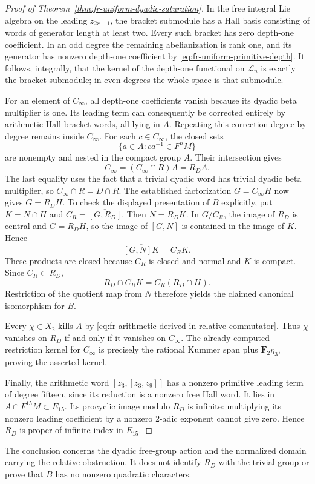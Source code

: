 \begin{proof}[Proof of Theorem~\ref{thm:fr-uniform-dyadic-saturation}]
In the free integral Lie algebra on the leading
$z_{2r+1}$, the bracket submodule has a Hall basis
consisting of words of generator length at least two.
Every such bracket has zero depth-one coefficient.
In an odd degree the remaining abelianization is
rank one, and its generator has nonzero depth-one
coefficient by
\eqref{eq:fr-uniform-primitive-depth}.
It follows, integrally, that the kernel of the
depth-one functional on $\mathcal L_n$ is exactly
the bracket submodule; in even degrees the whole
space is that submodule.

For an element of $C_\infty$, all depth-one coefficients
vanish because its dyadic beta multiplier is one.
Its leading term can consequently be corrected entirely
by arithmetic Hall bracket words, all lying in $A$.
Repeating this correction degree by degree remains
inside $C_\infty$. For each $c\in C_\infty$, the closed
sets
\[
 \{a\in A:c a^{-1}\in F^nM\}
\]
are nonempty and nested in the compact group $A$.
Their intersection gives
\[
 C_\infty=(C_\infty\cap R)A=R_DA.
\]
The last equality uses the fact that a trivial dyadic
word has trivial dyadic beta multiplier, so
$C_\infty\cap R=D\cap R$.
The established factorization $G=C_\infty H$ now gives
$G=R_DH$. To check the displayed presentation of $B$ explicitly,
put $K=N\cap H$ and $C_R=\overline{[G,R_D]}$.
Then $N=R_DK$. In $G/C_R$, the image of $R_D$ is central
and $G=R_DH$, so the image of $[G,N]$ is contained in the
image of $K$. Hence
\[
 \overline{[G,N]K}=C_RK.
\]
These products are closed because $C_R$ is closed and normal
and $K$ is compact. Since $C_R\subset R_D$,
\[
 R_D\cap C_RK=C_R(R_D\cap H).
\]
Restriction of the quotient map from $N$ therefore yields
the claimed canonical isomorphism for $B$.

Every $\chi\in X_2$ kills $A$ by
\eqref{eq:fr-arithmetic-derived-in-relative-commutator}.
Thus $\chi$ vanishes on $R_D$ if and only if it vanishes
on $C_\infty$. The already computed restriction kernel
for $C_\infty$ is precisely the rational Kummer span
plus $\mathbf F_2\eta_3$, proving the asserted kernel.

Finally, the arithmetic word
$[z_3,[z_3,z_9]]$ has a nonzero primitive leading term
of degree fifteen, since its reduction is a nonzero
free Hall word. It lies in $A\cap F^{15}M\subset E_{15}$.
Its procyclic image modulo $R_D$ is infinite: multiplying
its nonzero leading coefficient by a nonzero $2$-adic
exponent cannot give zero. Hence $R_D$ is proper of
infinite index in $E_{15}$.
\end{proof}

\begin{remark}
The conclusion concerns the dyadic free-group action and
the normalized domain carrying the relative obstruction.
It does not identify $R_D$ with the trivial group or
prove that $B$ has no nonzero quadratic characters.
\end{remark}
